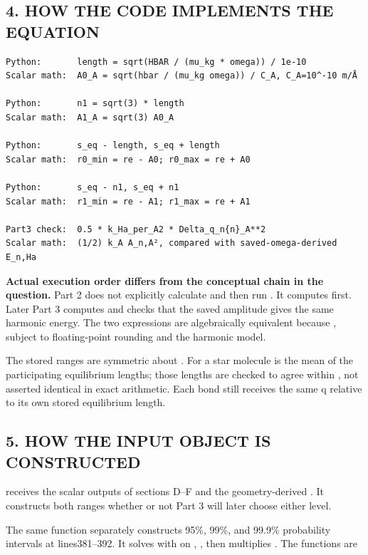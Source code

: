 \documentclass[10pt,a4paper]{article}
\begin{document}
\subsection{4. HOW THE CODE IMPLEMENTS THE EQUATION}
\begin{Verbatim}
Python:       length = sqrt(HBAR / (mu_kg * omega)) / 1e-10
Scalar math:  A0_A = sqrt(hbar / (mu_kg omega)) / C_A, C_A=10^-10 m/Å

Python:       n1 = sqrt(3) * length
Scalar math:  A1_A = sqrt(3) A0_A

Python:       s_eq - length, s_eq + length
Scalar math:  r0_min = re - A0; r0_max = re + A0

Python:       s_eq - n1, s_eq + n1
Scalar math:  r1_min = re - A1; r1_max = re + A1

Part3 check:  0.5 * k_Ha_per_A2 * Delta_q_n{n}_A**2
Scalar math:  (1/2) k_A A_n,A², compared with saved-omega-derived E_n,Ha
\end{Verbatim}
\textbf{Actual execution order differs from the conceptual chain in the question.} Part 2 does not explicitly calculate  and then run . It computes  first. Later Part 3 computes  and checks that the saved amplitude gives the same harmonic energy. The two expressions are algebraically equivalent because , subject to floating-point rounding and the harmonic model.

The stored ranges are symmetric about . For a star molecule  is the mean of the participating equilibrium lengths; those lengths are checked to agree within , not asserted identical in exact arithmetic. Each bond still receives the same q relative to its own stored equilibrium length.

\subsection{5. HOW THE INPUT OBJECT IS CONSTRUCTED}
 receives the scalar outputs of sections D–F and the geometry-derived . It constructs both ranges whether or not Part 3 will later choose either level.

The same function separately constructs 95\%, 99\%, and 99.9\% probability intervals at lines381–392. It solves  with  on \code{[0,10]}, , then multiplies . The functions are
\end{document}
